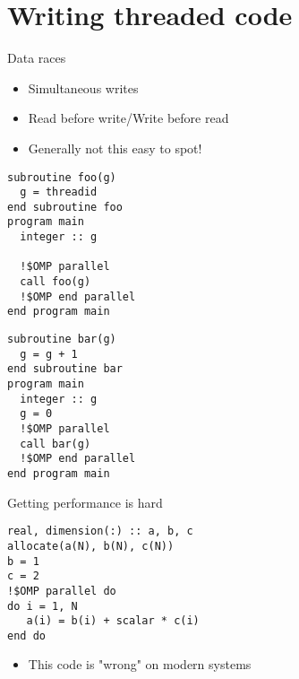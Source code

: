 \documentclass[bigger]{beamer}
\begin{document}
\section{Writing threaded code}
\label{sec:orgheadline14}
\begin{frame}[fragile,label={sec:orgheadline10}]{Data races}
 \begin{itemize}
\item Simultaneous writes
\item Read before write/Write before read
\item Generally not this easy to spot!
\end{itemize}
\begin{verbatim}
subroutine foo(g)
  g = threadid
end subroutine foo
program main
  integer :: g

  !$OMP parallel
  call foo(g)
  !$OMP end parallel
end program main
\end{verbatim}

\begin{verbatim}
subroutine bar(g)
  g = g + 1
end subroutine bar
program main
  integer :: g
  g = 0
  !$OMP parallel
  call bar(g)
  !$OMP end parallel
end program main
\end{verbatim}
\end{frame}

\begin{frame}[fragile,label={sec:orgheadline11}]{Getting performance is hard}
 \begin{verbatim}
real, dimension(:) :: a, b, c
allocate(a(N), b(N), c(N))
b = 1
c = 2
!$OMP parallel do
do i = 1, N
   a(i) = b(i) + scalar * c(i)
end do
\end{verbatim}
\begin{itemize}
\item This code is "wrong" on modern systems
\end{itemize}
\end{frame}
\end{document}
